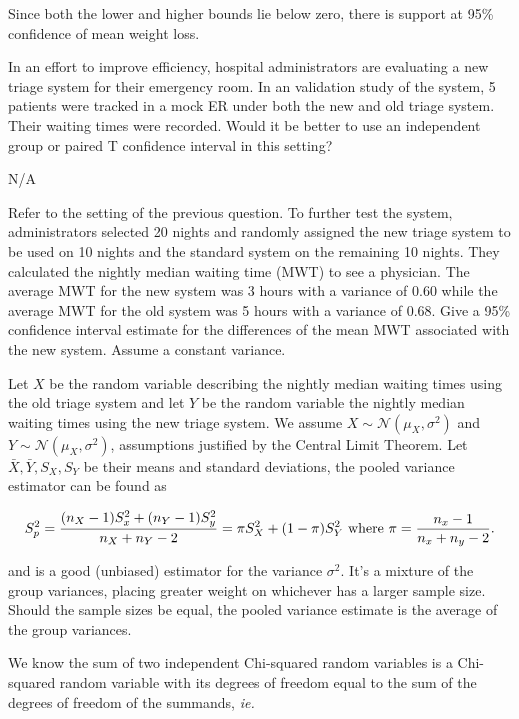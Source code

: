 \documentclass{homework}
\begin{document}
Since both the lower and higher bounds lie below zero, there is support at 95\% confidence of mean weight loss.\\

\begin{tcolorbox}[title=Question 4]
In an effort to improve efficiency, hospital administrators are evaluating a new triage system for their emergency room. In an validation study of the system, 5 patients were tracked in a mock ER under both the new and old triage system. Their waiting times were recorded. Would it be better to use an independent group or paired T confidence interval in this setting?
\end{tcolorbox}

N/A \\

\begin{tcolorbox}[title=Question 5]
Refer to the setting of the previous question. To further test the system, administrators selected 20 nights and randomly assigned the new triage system to be used on 10 nights and the standard system on the remaining 10 nights. They calculated the nightly median waiting time (MWT) to see a physician. The average MWT for the new system was 3 hours with a variance of 0.60 while the average MWT for the old system was 5 hours with a variance of 0.68. Give a 95\% confidence interval estimate for the differences of the mean MWT associated with the new system. Assume a constant variance.
\end{tcolorbox}

Let $X$ be the random variable describing the
nightly median waiting times using the old triage system and let $Y$ be the random variable the
nightly median waiting times using the new triage system. We assume $X \sim \mathcal{N}(\mu_X, \sigma^2)$ and $Y \sim \mathcal{N}(\mu_X, \sigma^2)$, assumptions justified by the Central Limit Theorem. Let $\bar X, \bar Y, S_X, S_Y$ be their means and standard deviations, the pooled variance estimator can be found as

$$
S_p^2 = \frac{(n_X-1)S_x^2 + (n_Y-1)S_y^2 }{n_X+n_Y-2} = \pi S_X^2 + (1-\pi) S_Y^2 \textnormal{  where } \pi = \frac{n_x-1}{n_x+n_y-2}.
$$

and is a good (unbiased) estimator for the variance $\sigma^2$. It's a mixture of the group variances, placing greater weight on whichever has a larger sample size. Should the sample sizes be equal, the pooled variance estimate is the average of the group variances. 

We know the sum of two independent Chi-squared random variables is a Chi-squared random variable with its degrees of freedom equal to the sum of the degrees of freedom of the summands, \textit{ie.} 
\end{document}
